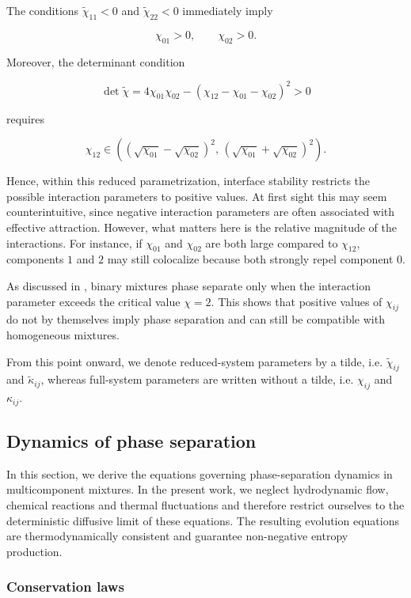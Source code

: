 \documentclass[12pt]{article}
\begin{document}
The conditions \(\tilde{\chi}_{11}<0\) and \(\tilde{\chi}_{22}<0\) immediately imply

\[
\chi_{01}>0,\qquad \chi_{02}>0.
\]

Moreover, the determinant condition

\[
\det\tilde{\chi}
=
4\chi_{01}\chi_{02}
-
(\chi_{12}-\chi_{01}-\chi_{02})^2
>0
\]

requires

\[
\chi_{12}\in
\left(
(\sqrt{\chi_{01}}-\sqrt{\chi_{02}})^2,\,
(\sqrt{\chi_{01}}+\sqrt{\chi_{02}})^2
\right).
\]

Hence, within this reduced parametrization, interface stability restricts the possible interaction parameters to positive values. At first sight this may seem counterintuitive, since negative interaction parameters are often associated with effective attraction. However, what matters here is the relative magnitude of the interactions. For instance, if \(\chi_{01}\) and \(\chi_{02}\) are both large compared to \(\chi_{12}\), components \(1\) and \(2\) may still colocalize because both strongly repel component \(0\).

As discussed in \cite{zwicker2025physicsdropletregulationbiological}, binary mixtures phase separate only when the interaction parameter exceeds the critical value \(\chi = 2\). This shows that positive values of \(\chi_{ij}\) do not by themselves imply phase separation and can still be compatible with homogeneous mixtures.

From this point onward, we denote reduced-system parameters by a tilde, i.e. \(\tilde{\chi}_{ij}\) and \(\tilde{\kappa}_{ij}\), whereas full-system parameters are written without a tilde, i.e. \(\chi_{ij}\) and \(\kappa_{ij}\).

\subsection{Dynamics of phase separation}

In this section, we derive the equations governing phase-separation dynamics in multicomponent mixtures.
In the present work, we neglect hydrodynamic flow, chemical reactions and thermal fluctuations and therefore restrict ourselves to the deterministic diffusive limit of these equations.
The resulting evolution equations are thermodynamically consistent and guarantee non-negative entropy production.

\subsubsection{Conservation laws}
\end{document}
